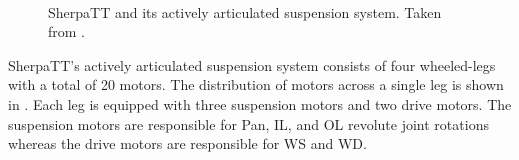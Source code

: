 \begin{figure}[h]
\begin{subfigure}[t]{\subfigureWidth}
            \label{fig:sherpatt-actively-articulated-suspension-system}
    \end{subfigure}\\[0.8ex]
    \caption[SherpaTT]
    {SherpaTT and its actively articulated suspension system. Taken from  .}
    \label{}
\vspace{-2ex}
\end{figure}

SherpaTT's actively articulated suspension system consists of four wheeled-legs with a total of 20 motors. The distribution of motors across a single leg is shown in . Each leg is equipped with three suspension motors and two drive motors. The suspension motors are responsible for Pan, \ac{IL}, and \ac{OL} revolute joint rotations whereas the drive motors are responsible for \ac{WS} and \ac{WD}.
